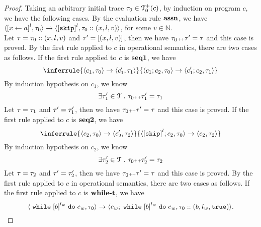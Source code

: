     \begin{proof}
      Taking an arbitrary initial trace $\mathtt{\tau}_0 \in \mathcal{T}^{+}_0(c)$, by induction on program $c$, we have the following cases.
      By the evaluation rule $\rname{assn}$, we have
      $
      {
      \config{\clabel{\assign{{x}}{\aexpr}}^{l},  \trace_0 } 
      \xrightarrow{} 
      \config{\clabel{\eskip}^{l}, \trace_0 :: ({x}, l, v)}
      }$, for some $v \in \mathbb{N}$.
      \\
      Let $\mathtt{\tau} = \mathtt{\tau}_0 ::({x}, l, v)$ and $\mathtt{\tau}' =  [({x}, l, v) ]$,
      then we have $\mathtt{\tau}_0 {\scriptscriptstyle ++} \mathtt{\tau}' = \mathtt{\tau}$ and this case is proved.
      By the first rule applied to $c$ in operational semantics, there are two cases as follows.
      If the first rule applied to $c$ is $\rname{seq1}$, we have
      \[
        \inferrule
        {
        \config{{c_1, \trace_0}}
        \xrightarrow{}
        \config{{c_1',  \trace_1}}
        }
        {
        \config{{c_1; c_2, \trace_0}} 
        \xrightarrow{} 
        \config{{c_1'; c_2, \trace_1}}
        }
      \]
      By induction hypothesis on $c_1$, we know 
      \[
        \exists \mathtt{\tau}_1' \in \mathcal{T} ~.~ \mathtt{\tau}_0 {\scriptscriptstyle ++} \mathtt{\tau}_1' = \mathtt{\tau}_1
      \]
      Let $\mathtt{\tau} = \mathtt{\tau}_1$ and $\mathtt{\tau}' =  \mathtt{\tau}_1'$,
      then we have $\mathtt{\tau}_0 {\scriptscriptstyle ++} \mathtt{\tau}' = \mathtt{\tau}$ and this case is proved.
      If the first rule applied to $c$ is $\rname{seq2}$, we have
      \[
        \inferrule
        {
        \config{{c_2, \trace_0}}
        \xrightarrow{}
        \config{{c_2',  \trace_2}}
        }
        {
        \config{{\clabel{\eskip}^l; c_2, \trace_0}} 
        \xrightarrow{} 
        \config{{c_2, \trace_2}}
        }
      \]
      By induction hypothesis on $c_2$, we know 
      \[
        \exists \mathtt{\tau}_2' \in \mathcal{T} ~.~ \mathtt{\tau}_0 {\scriptscriptstyle ++} \mathtt{\tau}_2' = \mathtt{\tau}_2
      \]
      Let $\mathtt{\tau} = \mathtt{\tau}_2$ and $\mathtt{\tau}' =  \mathtt{\tau}_2'$,
      then we have $\mathtt{\tau}_0 {\scriptscriptstyle ++} \mathtt{\tau}' = \mathtt{\tau}$ and this case is proved.
      By the first rule applied to $c$ in operational semantics, there are two cases as follows.
      If the first rule applied to $c$ is $\rname{while-t}$, we have
      \[
        \config{{\ewhile \clabel{b}^{l_w} \edo c_w, \trace_0}}
        \xrightarrow{} 
        \config{{
        c_w; \ewhile \clabel{b}^{l_w} \edo c_w,
        \trace_0 :: (b, l_w, \etrue)}}.
      \]

\end{proof}

